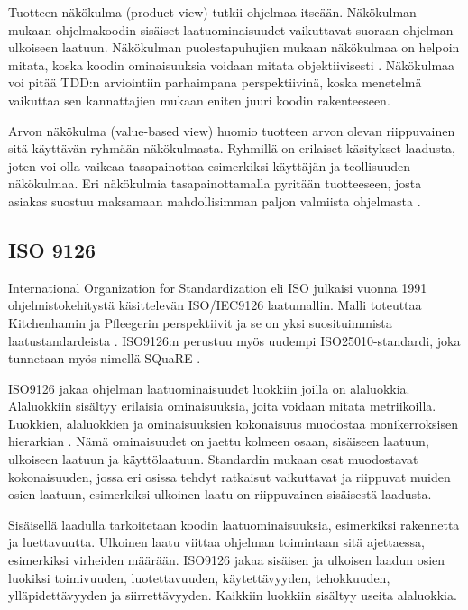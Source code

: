 \documentclass[finnish]{tktltiki2}
\theoremstyle{definition}
\theoremstyle{remark}
\begin{document}
Tuotteen näkökulma (product view) tutkii ohjelmaa itseään. Näkökulman mukaan ohjelmakoodin sisäiset laatuominaisuudet vaikuttavat suoraan ohjelman ulkoiseen laatuun. Näkökulman puolestapuhujien mukaan näkökulmaa on helpoin mitata, koska koodin ominaisuuksia voidaan mitata objektiivisesti \cite{Kitchenham96}. Näkökulmaa voi pitää TDD:n arviointiin parhaimpana perspektiivinä, koska menetelmä vaikuttaa sen kannattajien mukaan eniten juuri koodin rakenteeseen.

Arvon näkökulma (value-based view) huomio tuotteen arvon olevan riippuvainen sitä käyttävän ryhmään näkökulmasta. Ryhmillä on erilaiset käsitykset laadusta, joten voi olla vaikeaa tasapainottaa esimerkiksi käyttäjän ja teollisuuden näkökulmaa. Eri näkökulmia tasapainottamalla pyritään tuotteeseen, josta asiakas suostuu maksamaan mahdollisimman paljon valmiista ohjelmasta \cite{Kitchenham96}.  

\subsection{ISO 9126}

International Organization for Standardization eli ISO julkaisi vuonna 1991 ohjelmistokehitystä käsittelevän ISO/IEC9126 \cite{ISO9126} laatumallin. Malli toteuttaa Kitchenhamin ja Pfleegerin perspektiivit \cite{Cote07}  ja se on yksi suosituimmista laatustandardeista \cite{Botella04}. ISO9126:n perustuu myös uudempi ISO25010-standardi, joka tunnetaan myös nimellä SQuaRE \cite{ISO2011}.

 ISO9126 jakaa ohjelman laatuominaisuudet luokkiin joilla on alaluokkia. Alaluokkiin sisältyy erilaisia ominaisuuksia, joita voidaan mitata metriikoilla. Luokkien, alaluokkien ja ominaisuuksien kokonaisuus muodostaa monikerroksisen hierarkian \cite{Miguel14}. Nämä ominaisuudet on jaettu kolmeen osaan, sisäiseen laatuun, ulkoiseen laatuun ja käyttölaatuun. Standardin mukaan osat muodostavat kokonaisuuden, jossa eri osissa tehdyt ratkaisut vaikuttavat ja riippuvat muiden osien laatuun, esimerkiksi ulkoinen laatu on riippuvainen sisäisestä laadusta.



Sisäisellä laadulla tarkoitetaan koodin laatuominaisuuksia, esimerkiksi rakennetta ja luettavuutta. Ulkoinen laatu viittaa ohjelman toimintaan sitä ajettaessa, esimerkiksi virheiden määrään. ISO9126 jakaa sisäisen ja ulkoisen laadun osien luokiksi toimivuuden, luotettavuuden, käytettävyyden, tehokkuuden, ylläpidettävyyden ja siirrettävyyden. Kaikkiin luokkiin sisältyy useita alaluokkia.
\end{document}
